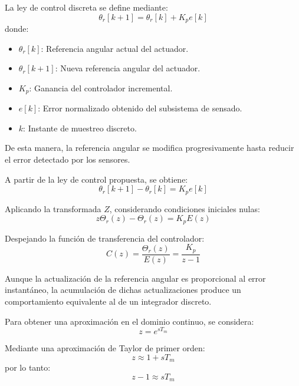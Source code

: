 \documentclass[12pt,a4paper]{article}
\begin{document}
La ley de control discreta se define mediante:
\begin{equation}
\boxed{\theta_r[k+1] = \theta_r[k] + K_p e[k]}
\end{equation}
donde:
\begin{itemize}
    \item $\theta_r[k]$: Referencia angular actual del actuador.
    \item $\theta_r[k+1]$: Nueva referencia angular del actuador.
    \item $K_p$: Ganancia del controlador incremental.
    \item $e[k]$: Error normalizado obtenido del subsistema de sensado.
    \item $k$: Instante de muestreo discreto.
\end{itemize}

De esta manera, la referencia angular se modifica progresivamente hasta reducir el error detectado por los sensores.

A partir de la ley de control propuesta, se obtiene:
\begin{equation}
\theta_r[k+1] - \theta_r[k] = K_p e[k]
\end{equation}

Aplicando la transformada $Z$, considerando condiciones iniciales nulas:
\begin{equation}
z\Theta_r(z) - \Theta_r(z) = K_p E(z)
\end{equation}

Despejando la función de transferencia del controlador:
\begin{equation}
\boxed{C(z) = \frac{\Theta_r(z)}{E(z)} = \frac{K_p}{z - 1}}
\end{equation}

Aunque la actualización de la referencia angular es proporcional al error instantáneo, la acumulación de dichas actualizaciones produce un comportamiento equivalente al de un integrador discreto.

Para obtener una aproximación en el dominio continuo, se considera:
\begin{equation}
z = e^{sT_m}
\end{equation}

Mediante una aproximación de Taylor de primer orden:
\begin{equation}
z \approx 1 + sT_m
\end{equation}
por lo tanto:
\begin{equation}
z - 1 \approx sT_m
\end{equation}
\end{document}
